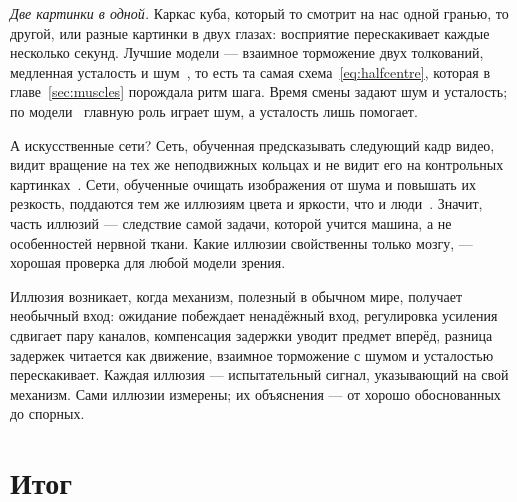 \emph{Две картинки в одной.} Каркас куба, который то смотрит на нас одной гранью, то другой, или разные картинки в двух глазах: восприятие перескакивает каждые несколько секунд. Лучшие модели --- взаимное торможение двух толкований, медленная усталость и шум~\cite{MorenoBote2007}, то есть та самая схема~\eqref{eq:halfcentre}, которая в главе~\ref{sec:muscles} порождала ритм шага. Время смены задают шум и усталость; по модели~\cite{MorenoBote2007} главную роль играет шум, а усталость лишь помогает.

А искусственные сети? Сеть, обученная предсказывать следующий кадр видео, видит вращение на тех же неподвижных кольцах и не видит его на контрольных картинках~\cite{Watanabe2018}. Сети, обученные очищать изображения от шума и повышать их резкость, поддаются тем же иллюзиям цвета и яркости, что и люди~\cite{GomezVilla2020}. Значит, часть иллюзий --- следствие самой задачи, которой учится машина, а не особенностей нервной ткани. Какие иллюзии свойственны только мозгу, --- хорошая проверка для любой модели зрения.

\begin{keyblock}
\begin{proposition}
\label{prop:illusions}
Иллюзия возникает, когда механизм, полезный в обычном мире, получает необычный вход: ожидание побеждает ненадёжный вход, регулировка усиления сдвигает пару каналов, компенсация задержки уводит предмет вперёд, разница задержек читается как движение, взаимное торможение с шумом и усталостью перескакивает. Каждая иллюзия --- испытательный сигнал, указывающий на свой механизм. Сами иллюзии измерены; их объяснения --- от хорошо обоснованных до спорных.
\end{proposition}
\end{keyblock}

\section{Итог}

